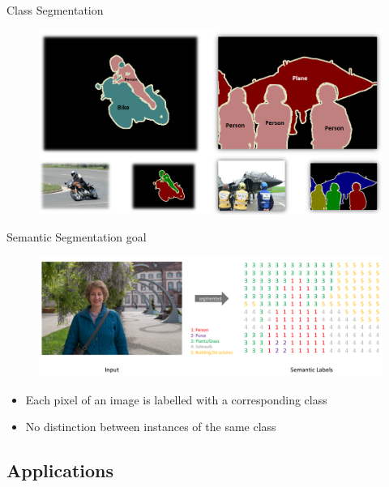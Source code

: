 \documentclass[12]{beamer}
\begin{document}
\begin{frame}{Class Segmentation}

\begin{figure}
\includegraphics[width=\textwidth]{segmentation_class}
\end{figure}

\end{frame}

\begin{frame}{Semantic Segmentation goal}

\begin{figure}
\includegraphics[width=\textwidth]{goal}
\end{figure}

\begin{itemize}
	\item Each pixel of an image is labelled with a corresponding class 
	\item No distinction between instances of the same class
\end{itemize}

\end{frame}



\subsection{Applications}
\end{document}
